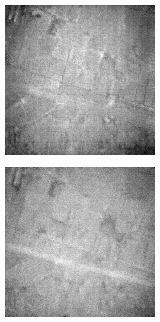 \begin{figure}
\begin{subfigure}[b]{0.19\textwidth}
    \end{subfigure}
    \hfill
    \begin{subfigure}[b]{0.19\textwidth}
        \centering
        \includegraphics[width=\textwidth]{../figs/outputs/cut/71.png}
    \end{subfigure}
    \hfill
    \begin{subfigure}[b]{0.19\textwidth}
        \centering
        \includegraphics[width=\textwidth]{../figs/outputs/petit/71.png}

\end{subfigure}
\end{figure}
